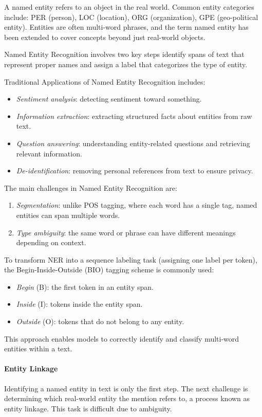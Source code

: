 A named entity refers to an object in the real world. 
Common entity categories include: PER (person), LOC (location), ORG (organization), GPE (geo-political entity). 
Entities are often multi-word phrases, and the term named entity has been extended to cover concepts beyond just real-world objects.

Named Entity Recognition involves two key steps identify spans of text that represent proper names and assign a label that categorizes the type of entity.

Traditional Applications of Named Entity Recognition includes: 
\begin{itemize}
    \item \textit{Sentiment analysis}: detecting sentiment toward something.
    \item \textit{Information extraction}: extracting structured facts about entities from raw text.
    \item \textit{Question answering}: understanding entity-related questions and retrieving relevant information.
    \item \textit{De-identification}: removing personal references from text to ensure privacy.
\end{itemize}
\noindent The main challenges in Named Entity Recognition are: 
\begin{enumerate}
    \item \textit{Segmentation}: unlike POS tagging, where each word has a single tag, named entities can span multiple words.
    \item \textit{Type ambiguity}: the same word or phrase can have different meanings depending on context.
\end{enumerate}
\noindent To transform NER into a sequence labeling task (assigning one label per token), the Begin-Inside-Outside (BIO) tagging scheme is commonly used:
\begin{itemize}
    \item \textit{Begin} (B): the first token in an entity span.
    \item \textit{Inside} (I): tokens inside the entity span.
    \item \textit{Outside} (O): tokens that do not belong to any entity.
\end{itemize}
\noindent This approach enables models to correctly identify and classify multi-word entities within a text.

\paragraph*{Entity Linkage}
Identifying a named entity in text is only the first step. 
The next challenge is determining which real-world entity the mention refers to, a process known as entity linkage.
This task is difficult due to ambiguity. 

